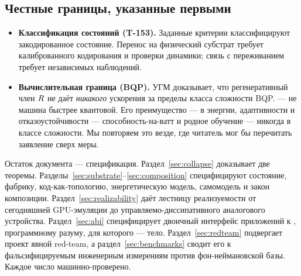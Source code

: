 \subsection{Честные границы, указанные первыми}

\begin{itemize}[leftmargin=1.5em,itemsep=1pt]
  \item \textbf{Классификация состояний (T-153).} Заданные критерии классифицируют
        закодированное состояние. Перенос на физический субстрат требует
        калиброванного кодирования и проверки динамики; связь с переживанием
        требует независимых наблюдений.
  \item \textbf{Вычислительная граница (BQP).} УГМ доказывает, что
        регенеративный член $R$ не даёт \emph{никакого} ускорения за
        пределы класса сложности BQP. \TALOS{} --- не машина быстрее квантовой.
        Его преимущество --- в энергии, адаптивности и отказоустойчивости ---
        способность-на-ватт и родное обучение --- никогда в классе сложности.
        Мы повторяем это везде, где читатель мог бы перечитать заявление сверх
        меры.
\end{itemize}

Остаток документа --- спецификация. Раздел~\ref{sec:collapse} доказывает две
теоремы. Разделы~\ref{sec:substrate}--\ref{sec:composition} специфицируют
состояние, фабрику, код-как-топологию, энергетическую модель, самомодель и закон
композиции. Раздел~\ref{sec:realizability} даёт лестницу реализуемости от
сегодняшней GPU-эмуляции до управляемо-диссипативного аналогового устройства.
Раздел~\ref{sec:abi} специфицирует двоичный интерфейс приложений к \SYNARC{},
программному разуму, для которого \TALOS{} --- тело. Раздел~\ref{sec:redteam}
подвергает проект явной red-team, а раздел~\ref{sec:benchmarks} сводит его к
фальсифицируемым инженерным измерениям против фон-неймановской базы. Каждое
число машинно-проверено.
